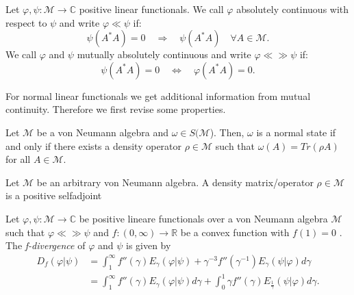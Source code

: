 \begin{definition}
    Let $\varphi, \psi:\mathcal{M}\rightarrow \mathbb{C}$ positive linear
    functionals.
    We call $\varphi$ absolutely continuous with respect to $\psi$ and
    write $\varphi \ll \psi$ if:
    \begin{equation}
        \psi(A^*A) = 0\quad\Longrightarrow\quad \psi(A^*A)\quad\forall A\in\mathcal{M}.
    \end{equation}
    We call $\varphi$ and $\psi$ mutually absolutely continuous and write 
    $\varphi \ll \gg \psi$ if:
    \begin{equation}
        \psi(A^*A) = 0\quad\Longleftrightarrow\quad \varphi(A^*A) = 0.
    \end{equation}
\end{definition}

For normal linear functionals we get additional information from
mutual continuity.
Therefore we first revise some properties.


\begin{theorem}
    Let $\mathcal{M}$ be a von Neumann algebra and $\omega\in S(\mathcal{M}$).
    Then, $\omega$ is a normal state if and only if there exists a density
    operator $\rho\in \mathcal{M}$ such that
    $\omega(A) = Tr(\rho A)$ for all $A\in\mathcal{M}$.
\end{theorem}

\begin{definition}
    Let $\mathcal{M}$ be an arbitrary von Neumann algebra.
    A density matrix/operator $\rho\in\mathcal{M}$ is a positive
    selfadjoint 

\end{definition}

\begin{definition}\label{def:f_div}
Let $\varphi, \psi:\mathcal{M}\rightarrow\mathbb{C}$ be positive lineare functionals over a von
Neumann algebra $\mathcal{M}$ such that
$\varphi \ll \gg \psi$
and $f:(0,\infty)\rightarrow \mathbb{R}$ be a convex function with
$f(1) = 0$ .
The \textit{f-divergence} of $\varphi$ and $\psi$ is given by
\begin{equation}
\begin{split}
    D_f(\varphi| \psi) &= \int_{1}^{\infty}
    f''(\gamma) E_\gamma(\varphi| \psi)
    + \gamma^{-3} f''(\gamma^{-1}) E_\gamma(\psi|\varphi) d\gamma\\
    &= \int_{1}^{\infty} f''(\gamma) E_\gamma(\varphi|\psi) d\gamma
    + \int_{0}^{1} \gamma f''(\gamma) E_{\frac{1}{\gamma}}(\psi|\varphi) d\gamma.
\end{split}
\end{equation}
\end{definition}

